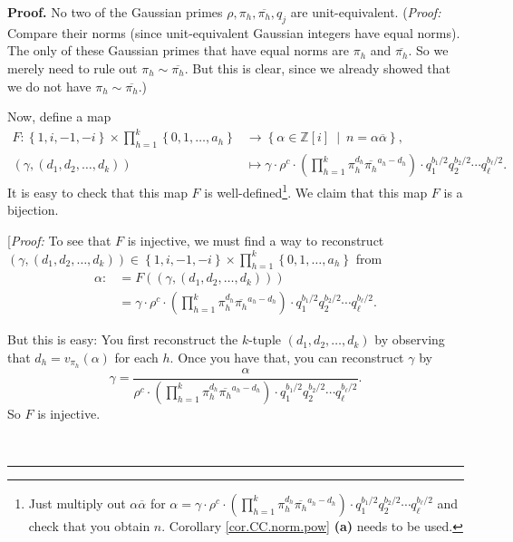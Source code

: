 \documentclass[numbers=enddot,12pt,final,onecolumn,notitlepage]{scrartcl}%
\numberwithin{exer}{subsection}
\theoremstyle{definition}
\newenvironment{proof}[1][Proof]{\noindent\textbf{#1.} }{\ \rule{0.5em}{0.5em}}
\let\prodnonlimits\prod
\renewcommand{\prod}{\prodnonlimits\limits}
\begin{document}
\begin{proof}
No two of the Gaussian primes $\rho,\pi_{h},\overline{\pi_{h}},q_{j}$ are
unit-equivalent. (\textit{Proof:} Compare their norms (since unit-equivalent
Gaussian integers have equal norms). The only of these Gaussian primes that
have equal norms are $\pi_{h}$ and $\overline{\pi_{h}}$. So we merely need to
rule out $\pi_{h}\sim\overline{\pi_{h}}$. But this is clear, since we already
showed that we do not have $\pi_{h}\sim\overline{\pi_{h}}$.)

Now, define a map%
\begin{align*}
F:\left\{  1,i,-1,-i\right\}  \times\prod_{h=1}^{k}\left\{  0,1,\ldots
,a_{h}\right\}   &  \rightarrow\left\{  \alpha\in\mathbb{Z}\left[  i\right]
\ \mid\ n=\alpha\overline{\alpha}\right\}  ,\\
\left(  \gamma,\left(  d_{1},d_{2},\ldots,d_{k}\right)  \right)   &
\mapsto\gamma\cdot\rho^{c}\cdot\left(  \prod_{h=1}^{k}\pi_{h}^{d_{h}}%
\overline{\pi_{h}}^{a_{h}-d_{h}}\right)  \cdot q_{1}^{b_{1}/2}q_{2}^{b_{2}%
/2}\cdots q_{\ell}^{b_{\ell}/2}.
\end{align*}
It is easy to check that this map $F$ is well-defined\footnote{Just multiply
out $\alpha\overline{\alpha}$ for $\alpha=\gamma\cdot\rho^{c}\cdot\left(
\prod_{h=1}^{k}\pi_{h}^{d_{h}}\overline{\pi_{h}}^{a_{h}-d_{h}}\right)  \cdot
q_{1}^{b_{1}/2}q_{2}^{b_{2}/2}\cdots q_{\ell}^{b_{\ell}/2}$ and check that you
obtain $n$. Corollary \ref{cor.CC.norm.pow} \textbf{(a)} needs to be used.}.
We claim that this map $F$ is a bijection.

[\textit{Proof:} To see that $F$ is injective, we must find a way to
reconstruct $\left(  \gamma,\left(  d_{1},d_{2},\ldots,d_{k}\right)  \right)
\in\left\{  1,i,-1,-i\right\}  \times\prod_{h=1}^{k}\left\{  0,1,\ldots
,a_{h}\right\}  $ from
\begin{align*}
\alpha:  &  =F\left(  \left(  \gamma,\left(  d_{1},d_{2},\ldots,d_{k}\right)
\right)  \right) \\
&  =\gamma\cdot\rho^{c}\cdot\left(  \prod_{h=1}^{k}\pi_{h}^{d_{h}}%
\overline{\pi_{h}}^{a_{h}-d_{h}}\right)  \cdot q_{1}^{b_{1}/2}q_{2}^{b_{2}%
/2}\cdots q_{\ell}^{b_{\ell}/2}.
\end{align*}


But this is easy: You first reconstruct the $k$-tuple $\left(  d_{1}%
,d_{2},\ldots,d_{k}\right)  $ by observing that $d_{h}=v_{\pi_{h}}\left(
\alpha\right)  $ for each $h$. Once you have that, you can reconstruct
$\gamma$ by%
\[
\gamma=\dfrac{\alpha}{\rho^{c}\cdot\left(  \prod_{h=1}^{k}\pi_{h}^{d_{h}%
}\overline{\pi_{h}}^{a_{h}-d_{h}}\right)  \cdot q_{1}^{b_{1}/2}q_{2}^{b_{2}%
/2}\cdots q_{\ell}^{b_{\ell}/2}}.
\]
So $F$ is injective.


\end{proof}
\end{document}
